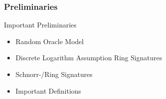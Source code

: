 \begin{frame}
	\frametitle{Preliminaries}

	Important Preliminaries

	\begin{itemize}
		\item Random Oracle Model
		\item Discrete Logarithm Assumption Ring Signatures
		\item Schnorr-/Ring Signatures
		\item Important Definitions
	\end{itemize}
\end{frame}